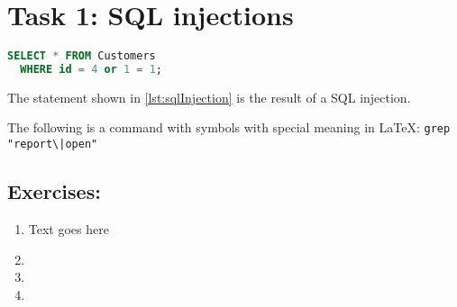 \section*{Task 1: SQL injections}

\begin{lstlisting}[caption={Here's a caption.},
                   language=SQL,
                   label=lst:sqlInjection]
  SELECT * FROM Customers
  WHERE id = 4 or 1 = 1;
\end{lstlisting}
The statement shown in \autoref{lst:sqlInjection} is the result of a SQL injection.

The following is a command with symbols with special meaning in \LaTeX: \lstinline{grep "report\|open"}

\subsection*{Exercises:}
\begin{enumerate}
\item Text goes here
\item
\item
\item
\end{enumerate}
